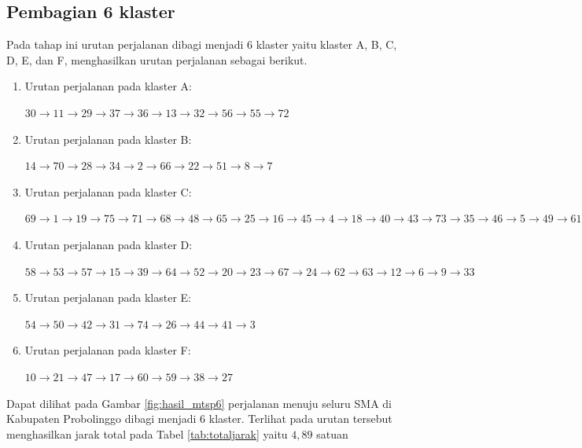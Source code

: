 \subsection{Pembagian 6 klaster}

Pada tahap ini urutan perjalanan dibagi menjadi 6 klaster yaitu klaster A, B, C, D, E, dan F, menghasilkan urutan perjalanan sebagai berikut.

\begin{enumerate}

\item Urutan perjalanan pada klaster A:

$30\rightarrow11\rightarrow29\rightarrow37\rightarrow36\rightarrow13\rightarrow32\rightarrow56\rightarrow55\rightarrow72$

\item Urutan perjalanan pada klaster B:

$14\rightarrow70\rightarrow28\rightarrow34\rightarrow2\rightarrow66\rightarrow22\rightarrow51\rightarrow8\rightarrow7$

\item Urutan perjalanan pada klaster C:

$69\rightarrow1\rightarrow19\rightarrow75\rightarrow71\rightarrow68\rightarrow48\rightarrow65\rightarrow25\rightarrow16\rightarrow45\rightarrow4\rightarrow18\rightarrow40\rightarrow43\rightarrow73\rightarrow35\rightarrow46\rightarrow5\rightarrow49\rightarrow61$

\item Urutan perjalanan pada klaster D:

$58\rightarrow53\rightarrow57\rightarrow15\rightarrow39\rightarrow64\rightarrow52\rightarrow20\rightarrow23\rightarrow67\rightarrow24\rightarrow62\rightarrow63\rightarrow12\rightarrow6\rightarrow9\rightarrow33$

\item Urutan perjalanan pada klaster E:

$54\rightarrow50\rightarrow42\rightarrow31\rightarrow74\rightarrow26\rightarrow44\rightarrow41\rightarrow3$

\item Urutan perjalanan pada klaster F:

$10\rightarrow21\rightarrow47\rightarrow17\rightarrow60\rightarrow59\rightarrow38\rightarrow27$

\end{enumerate}

Dapat dilihat pada Gambar \ref{fig:hasil_mtsp6} perjalanan menuju seluru SMA di Kabupaten Probolinggo dibagi menjadi 6 klaster. Terlihat pada urutan tersebut menghasilkan jarak total pada Tabel \ref{tab:totaljarak} yaitu $4,89$ satuan

